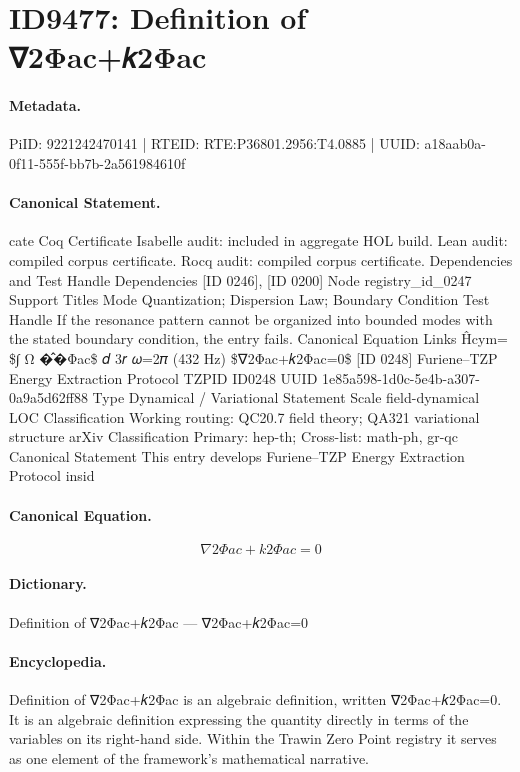 \section*{ID9477: Definition of ∇2Φac+𝑘2Φac}
\paragraph{Metadata.}
PiID: 9221242470141 | RTEID: RTE:P36801.2956:T4.0885 | UUID: a18aab0a-0f11-555f-bb7b-2a561984610f

\paragraph{Canonical Statement.}
cate Coq Certificate Isabelle audit: included in aggregate HOL build. Lean audit: compiled corpus certificate. Rocq audit: compiled corpus certificate. Dependencies and Test Handle Dependencies [ID 0246], [ID 0200] Node registry\_id\_0247 Support Titles Mode Quantization; Dispersion Law; Boundary Condition Test Handle If the resonance pattern cannot be organized into bounded modes with the stated boundary condition, the entry fails. Canonical Equation Links Ĥcym= \$∫ Ω �̂�Φac\$ 𝑑 3𝑟 𝜔=2𝜋 (432 Hz) \$∇2Φac+𝑘2Φac=0\$ [ID 0248] Furiene–TZP Energy Extraction Protocol TZPID ID0248 UUID 1e85a598-1d0c-5e4b-a307-0a9a5d62ff88 Type Dynamical / Variational Statement Scale field-dynamical LOC Classification Working routing: QC20.7 field theory; QA321 variational structure arXiv Classification Primary: hep-th; Cross-list: math-ph, gr-qc Canonical Statement This entry develops Furiene–TZP Energy Extraction Protocol insid

\paragraph{Canonical Equation.}
\[
∇2Φac+𝑘2Φac=0
\]

\paragraph{Dictionary.}
Definition of ∇2Φac+𝑘2Φac — ∇2Φac+𝑘2Φac=0

\paragraph{Encyclopedia.}
Definition of ∇2Φac+𝑘2Φac is an algebraic definition, written ∇2Φac+𝑘2Φac=0. It is an algebraic definition expressing the quantity directly in terms of the variables on its right-hand side. Within the Trawin Zero Point registry it serves as one element of the framework's mathematical narrative.
